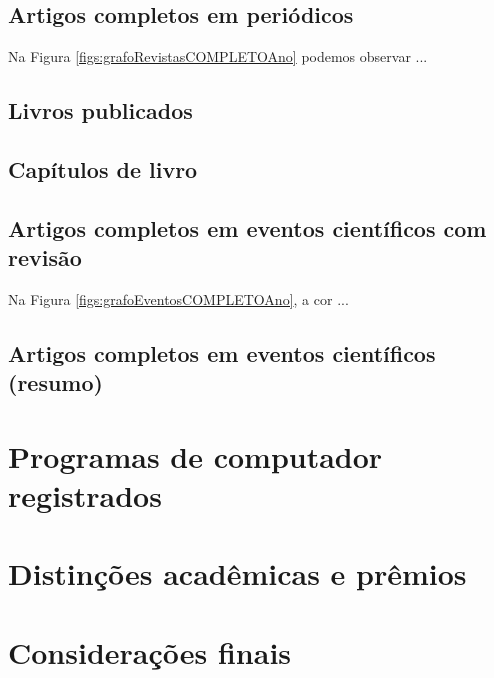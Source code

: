 
\subsection{Artigos completos em periódicos}




Na Figura \ref{figs:grafoRevistasCOMPLETOAno} podemos observar ...

\subsection{Livros publicados}



\subsection{Capítulos de livro}



\subsection{Artigos completos em eventos científicos com revisão}



Na Figura \ref{figs:grafoEventosCOMPLETOAno}, a cor ...

\subsection{Artigos completos em eventos científicos (resumo)}



\section{Programas de computador registrados}\label{sec:registroSofware}



\section{Distinções acadêmicas e prêmios}



\section{Considerações finais}





